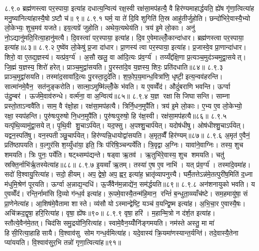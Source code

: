 ८.९.०
ब्रह्म॑णस्त्वा पर॒स्पाया॒ इत्या॑ह दधात्य॒न्वित्य॑ रक्ष॒स्वी रक्ष॑सा॒मप॑हत्यै॒ वै हिर॑ण्यमाहार्द्धयति॒ ह्ये॑ष गृ॑णा॒त्वित्या॑ह मनु॒ष्या॑नित्या॑हास्यै॒षोऽष्टौ च॑॥ ९॥
८.९.१
घर्म॒ या ते॑ दि॒वि शुगिति॑ ति॒स्र आहु॑तीर्जुहोति। छन्दो॑भिरे॒वास्यै॒भ्यो लो॒केभ्यः॒ शुच॒मव॑ यजते। इय॒त्यग्रे॑ जुहोति। अथेय॒त्यथेय॑ति। त्रय॑ इ॒मे लो॒काः। अनु॑ नो॒ऽद्यानु॑मति॒रित्या॒हानु॑मत्यै। दि॒वस्त्वा॑ पर॒स्पाया॒ इत्या॑ह। दि॒व ए॒वेमाल्लोँ॒कान्दा॑धार। ब्रह्म॑णस्त्वा पर॒स्पाया॒ इत्या॑ह॥८३॥
८.९.२
ए॒ष्वे॑व लो॒केषु॑ प्र॒जा दा॑धार। प्रा॒णस्य॑ त्वा पर॒स्पाया॒ इत्या॑ह। प्र॒जास्वे॒व प्रा॒णान्दा॑धार। शिरो॒ वा ए॒तद्य॒ज्ञस्य॑। यत्प्र॑व॒र्ग्य॑। अ॒सौ खलु॒ वा आ॑दि॒त्यः प्र॑व॒र्ग्य॑। तय्यँद्द॑क्षि॒णा प्र॒त्यञ्च॒मुद॑ञ्चमुद्वा॒सयेत्। जि॒ह्मं य॒ज्ञस्य॒ शिरो॑ हरेत्। प्राञ्च॒मुद्वा॑सयति। पु॒रस्ता॑दे॒व य॒ज्ञस्य॒ शिरः॒ प्रति॑दधाति॥८४॥
८.९.३
प्राञ्च॒मुद्वा॑सयति। तस्मा॑द॒सावा॑दि॒त्यः पु॒रस्ता॒दुदे॑ति। श॒फो॒प॒य॒मान्ध॒वित्रा॑णि॒ धृष्टी॒ इत्य॒न्वव॑हरन्ति। सात्मा॑नमे॒वैन॒ सत॑नुङ्करोति। सात्मा॒ऽमुष्मि॑ल्लोँ॒के भ॑वति। य ए॒वव्वेँद॑। औदुं॑बराणि भवन्ति। ऊर्ग्वा उ॑दु॒म्बर॑। ऊर्ज॑मे॒वाव॑रुन्धे। वर्त्म॑ना॒ वा अ॒न्वित्य॑॥८५॥
८.९.४
य॒ज्ञ रक्षासि जिघासन्ति। साम्ना प्रस्तो॒ताऽन्ववै॑ति। साम॒ वै र॑क्षो॒हा। रक्ष॑सा॒मप॑हत्यै। त्रिर्नि॒धन॒मुपै॑ति। त्रय॑ इ॒मे लो॒काः। ए॒भ्य ए॒व लो॒केभ्यो॒ रक्षा॒स्यप॑हन्ति। पुरु॑षःपुरुषो नि॒धन॒मुपै॑ति। पुरु॑षःपुरुषो॒ हि र॑क्ष॒स्वी। रक्ष॑सा॒मप॑हत्यै॥८६॥
८.९.५
यत्पृ॑थि॒व्यामु॑द्वा॒सयेत्। पृ॒थि॒वी शु॒चाऽर्प॑येत्। यद॒फ्सु। अ॒पश्शु॒चार्प॑येत्। यदोष॑धीषु। ओष॑धीश्शु॒चाऽर्प॑येत्। यद्वन॒स्पति॑षु। वन॒स्पतीञ्छु॒चार्प॑येत्। हिर॑ण्यन्नि॒धायोद्वा॑सयति। अ॒मृत॒व्वैँ हिर॑ण्यम्॥८७॥
८.९.६
अ॒मृत॑ ए॒वैनं॒ प्रति॑ष्ठापयति। व॒ल्गुर॑सि श॒य्युँधा॑या॒ इति॒ त्रिः प॑रिषि॒ञ्चन्पर्ये॑ति। त्रि॒वृद्वा अ॒ग्निः। यावा॑ने॒वाग्निः। तस्य॒ शुच शमयति। त्रिः पुनः॒ पर्ये॑ति। षट्थ्सम्प॑द्यन्ते। षड्वा ऋ॒तव॑। ऋ॒तुभि॑रे॒वास्य॒ शुच शमयति। चतु॑ स्रक्ति॒र्नाभि॑र्\mbox{}ऋ॒तस्येत्या॑ह॥८८॥
८.९.७
इ॒यव्वाँ ऋ॒तम्। तस्या॑ ए॒ष ए॒व नाभि॑। यत् प्र॑व॒र्ग्य॑। तस्मा॑दे॒वमा॑ह। सदो॑ वि॒श्वायु॒रित्या॑ह। सदो॒ हीयम्। अप॒ द्वेषो॒ अप॒ ह्वर॒ इत्या॑ह॒ भ्रातृ॑व्यापनुत्त्यै। घर्मै॒तत्तेऽन्न॑मे॒तत्पुरी॑ष॒मिति॑ द॒ध्ना म॑धुमि॒श्रेण॑ पूरयति। ऊर्ग्वा अ॒न्नाद्य॒न्दधि॑। ऊ॒र्जैवैन॑म॒न्नाद्ये॑न॒ सम॑र्द्धयति॥८९॥
८.९.८
अन॑शनायुको भवति। य ए॒वव्वेँद॑। रन्ति॒र्नामा॑सि दि॒व्यो ग॑न्ध॒र्व इत्या॑ह। रू॒पमे॒वास्यै॒तन्म॑हि॒मान॒ रन्तिं॑ ब॒न्धुता॒व्व्याँच॑ष्टे। सम॒हमायु॑षा॒ सं प्रा॒णेनेत्या॑ह। आ॒शिष॑मे॒वैतामा शास्ते। व्य॑सौ योऽस्मान्द्वेष्टि॒ यञ्च॑ व॒यन्द्वि॒ष्म इत्या॑ह। अ॒भि॒चा॒र ए॒वास्यै॒षः। अचि॑क्रद॒द्वृषा॒ हरि॒रित्या॑ह। वृषा॒ ह्ये॑षः॥९०॥
८.९.९
वृषा॒ हरि॑। म॒हान्मि॒त्रो न द॑र्\mbox{}श॒त इत्या॑ह। स्तौत्ये॒वैन॑मे॒तत्। चिद॑सि समु॒द्रयो॑नि॒रित्या॑ह। स्वामे॒वैन॒य्योँनि॑ङ्गमयति। नम॑स्ते अस्तु॒ मा मा॑ हिसी॒रित्या॒हाहिसायै। वि॒श्वाव॑सु सोम गन्ध॒र्वमित्या॑ह। यदे॒वास्य॑ क्रि॒यमा॑णस्यान्त॒र्यन्ति॑। तदे॒वास्यै॒तेना प्या॑ययति। वि॒श्वाव॑सुर॒भि तन्नो॑ गृणा॒त्वित्या॑ह॥९१॥
